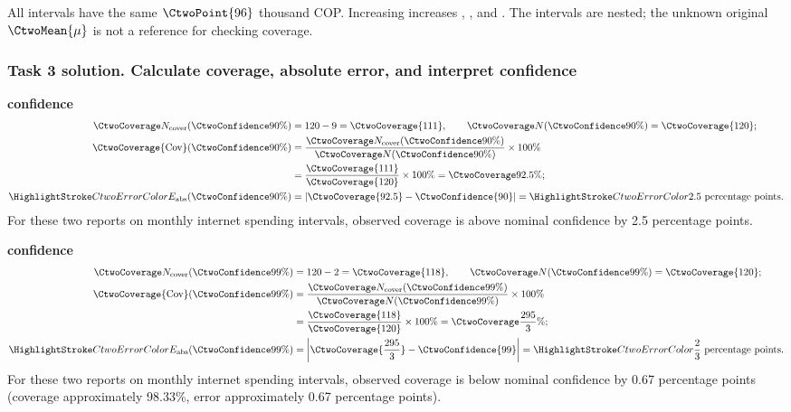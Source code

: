 All intervals have the same  $\CtwoPoint{96}$ thousand COP. Increasing  increases , , and . The intervals are nested; the unknown original $\CtwoMean{\mu}$ is not a reference for checking coverage.
\par\vspace{3mm}
\clearpage
\subsubsection*{Task 3 solution. Calculate coverage, absolute error, and interpret confidence}
\label{sol:c2-advanced-b-c}
\textbf{ confidence}\nopagebreak[4]
\begin{align*}
\CtwoCoverCount(\CtwoConfidence{90\%})&=120-9=\CtwoCoverage{111},
\qquad\CtwoTotalCount(\CtwoConfidence{90\%})=\CtwoCoverage{120};\\
\CtwoCoverage{\mathrm{Cov}}(\CtwoConfidence{90\%})
&=\frac{\CtwoCoverCount(\CtwoConfidence{90\%})}{\CtwoTotalCount(\CtwoConfidence{90\%})}\times100\%
\\
&=\frac{\CtwoCoverage{111}}{\CtwoCoverage{120}}\times100\%=\CtwoCoverage{92.5\%};\\
\CtwoError{E_{\rm abs}}(\CtwoConfidence{90\%})
&=\left|\CtwoCoverage{92.5}-\CtwoConfidence{90}\right|=\CtwoError{2.5}\ \text{percentage points}.
\end{align*}
For these two reports on monthly internet spending intervals, observed coverage is above nominal confidence by 2.5 percentage points.

\textbf{ confidence}\nopagebreak[4]
\begin{align*}
\CtwoCoverCount(\CtwoConfidence{99\%})&=120-2=\CtwoCoverage{118},
\qquad\CtwoTotalCount(\CtwoConfidence{99\%})=\CtwoCoverage{120};\\
\CtwoCoverage{\mathrm{Cov}}(\CtwoConfidence{99\%})
&=\frac{\CtwoCoverCount(\CtwoConfidence{99\%})}{\CtwoTotalCount(\CtwoConfidence{99\%})}\times100\%
\\
&=\frac{\CtwoCoverage{118}}{\CtwoCoverage{120}}\times100\%=\CtwoCoverage{\frac{295}{3}\%};\\
\CtwoError{E_{\rm abs}}(\CtwoConfidence{99\%})
&=\left|\CtwoCoverage{\frac{295}{3}}-\CtwoConfidence{99}\right|=\CtwoError{\frac{2}{3}}\ \text{percentage points}.
\end{align*}
For these two reports on monthly internet spending intervals, observed coverage is below nominal confidence by 0.67 percentage points (coverage approximately 98.33\%, error approximately 0.67 percentage points).

